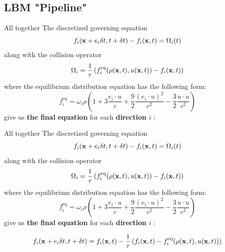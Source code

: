 \documentclass[9pt]{beamer}
\begin{document}
\subsection{LBM "Pipeline"}
\begin{frame}[t]{All together}
The discretized governing equation
\begin{equation*}
f_i({\bf x} + e_i \delta t, t + \delta t)- f_i({\bf x}, t) = \Omega_i(t)
\end{equation*}
along with the collision operator
\begin{equation*}
\Omega_i = \frac{1}{\tau}\left(f_i^\text{eq}(\rho({\bf x}, t), u({\bf x}, t)) - f_i({\bf x}, t)\right)
\end{equation*}
where the equilibrium distribution equation has the following form:
\begin{equation*}
f_i^\text{eq} = \omega_i \rho \left(1 + 3\frac{e_i \cdot u}{c} + \frac92 \frac{(e_i \cdot u)^2}{c^2} - \frac32 \frac{u\cdot u}{c^2}\right)
\end{equation*}
give us \textbf{the final equation} for each \textbf{direction $i$ }: 
\end{frame}


\begin{frame}[t]{All together}
The discretized governing equation
\begin{equation*}
f_i({\bf x} + e_i \delta t, t + \delta t)- f_i({\bf x}, t) = \Omega_i(t)
\end{equation*}
along with the collision operator
\begin{equation*}
\Omega_i = \frac{1}{\tau}\left(f_i^\text{eq}(\rho({\bf x}, t), u({\bf x}, t)) - f_i({\bf x}, t)\right)
\end{equation*}
where the equilibrium distribution equation has the following form:
\begin{equation*}
f_i^\text{eq} = \omega_i \rho \left(1 + 3\frac{e_i \cdot u}{c} + \frac92 \frac{(e_i \cdot u)^2}{c^2} - \frac32 \frac{u\cdot u}{c^2}\right)
\end{equation*}
give us \textbf{the final equation} for each \textbf{direction $i$ }:

\begin{equation*}
f_i({\bf x} + e_i \delta t, t + \delta t) = f_i({\bf x}, t) - \frac{1}{\tau}\left(f_i({\bf x}, t) - f_i^\text{eq}(\rho({\bf x}, t), u({\bf x}, t))\right)
\end{equation*}
\end{frame}
\end{document}
